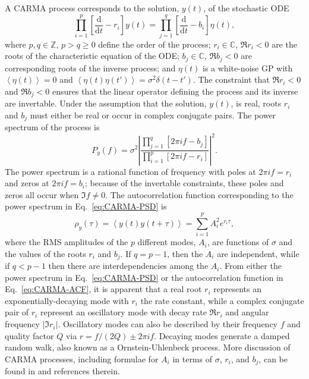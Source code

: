 \documentclass[modern]{aastex61}
\newcommand{\dd}{\mathrm{d}}
\newcommand{\diff}[2]{\frac{\dd #1}{\dd #2}}
\begin{document}
A CARMA process corresponds to the solution, $y(t)$, of the stochastic ODE
%
\begin{equation}
  \label{eq:GP-definition}
  \prod_{i=1}^{p} \left[ \diff{}{t} - r_i \right] y(t) =
  \prod_{j = 1}^{q} \left[ \diff{}{t} - b_i \right] \eta(t),
\end{equation}
%
where $p, q \in \mathbb{Z}$, $p > q \geq 0$ define the order of the process;
$r_i \in \mathbb{C}$, $\Re r_i < 0$ are the roots of the characteristic equation
of the ODE; $b_j \in \mathbb{C}$, $\Re b_j < 0$ are corresponding roots of the
inverse process; and $\eta(t)$ is a white-noise GP with
$\left\langle \eta(t) \right\rangle = 0$ and $\left\langle \eta(t) \eta(t')
\right\rangle = \sigma^2 \delta\left(t - t' \right)$.  The constraint that $\Re
r_i < 0$ and $\Re b_j < 0$ ensures that the linear operator defining the process
and its inverse are invertable.  Under the assumption that the solution, $y(t)$,
is real, roots $r_i$ and $b_j$ must either be real or occur in complex conjugate
pairs.  The power spectrum of the process is
%
\begin{equation}
  \label{eq:CARMA-PSD}
  P_y(f) = \sigma^2 \left| \frac{\prod_{j=1}^q \left[ 2 \pi i f - b_j \right]}{\prod_{i=1}^p \left[ 2 \pi i f - r_i \right]} \right|^2.
\end{equation}
%
The power spectrum is a rational function of frequency with poles at $2\pi i f =
r_i$ and zeros at $2\pi i f = b_i$; because of the invertable constraints, these
poles and zeros all occur when $\Im f \neq 0$.  The autocorrelation function
corresponding to the power spectrum in Eq.\ \eqref{eq:CARMA-PSD} is
%
\begin{equation}
  \label{eq:CARMA-ACF}
  \rho_y (\tau) = \left\langle y\left( t \right) y \left( t + \tau \right) \right\rangle = \sum_{i=1}^p A_i^2 e^{r_i \tau},
\end{equation}
%
where the RMS amplitudes of the $p$ different modes, $A_i$, are functions of
$\sigma$ and the values of the roots $r_i$ and $b_j$.  If $q = p-1$, then the
$A_i$ are independent, while if $q < p-1$ then there are interdependencies among
the $A_i$.  From either the power spectrum in Eq.\ \eqref{eq:CARMA-PSD} or the
autocorrelation function in Eq.\ \eqref{eq:CARMA-ACF}, it is apparent that a
real root $r_i$ represents an exponentially-decaying mode with $r_i$ the rate
constant, while a complex conjugate pair of $r_i$ represent an oscillatory mode
with decay rate $\Re r_i$ and angular frequency $\left|\Im r_i\right|$.
Oscillatory modes can also be described by their frequency $f$ and quality
factor $Q$ via $r = f/(2Q) \pm 2\pi i f$.  Decaying modes generate a damped
random walk, also known as a Ornstein-Uhlenbeck process.  More discussion of CARMA processes, including formulae for $A_i$ in terms of $\sigma$, $r_i$, and $b_j$, can be found in \citet{Kelly2014} and references therein.
\end{document}
